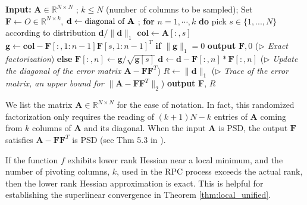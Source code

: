 \documentclass[11pt]{amsart}
\theoremstyle{plain}
\theoremstyle{definition}
\theoremstyle{remark}
\def\R{\mathbb{R}}
\def\A{\mathbf{A}}
\begin{document}
\begin{algorithm}[H]
	\small
	\caption{Random Pivoted Cholesky Factorization (RPC) \cite{chen2022randomly}}
	\label{algorithm:RPC_simple}
	\begin{algorithmic}[1]
		\State \textbf{Input:} $\A\in \R^{N\times N}$ ; $k\leq N$ (number of columns to be sampled); %
		\State \quad Set $\mathbf{F} \leftarrow O\in\R^{N\times k}$,  $\textbf{d}\leftarrow \textup{diagonal of $\A$}$ ; 
		\State \quad \textbf{for} $n=1,\cdots,k$ \textbf{do}
		\State \quad\quad pick $s\in\{1,...,N\}$ according to distribution $\mathbf{d}/\lVert \mathbf{d} \rVert_{1}$
		\State \quad\quad $\mathbf{col}\xleftarrow{} 
		\A[:,s]$
		\State \quad\quad $\mathbf{g}\xleftarrow{}\mathbf{col}-\mathbf{F}[:,1:n-1]\mathbf{F}[s,1:n-1]^T$
		\State \quad\quad \textbf{if} $\|\mathbf{g}\|_{1}=0$
		\State \quad\quad\quad \textbf{output} $\mathbf{F}, 0$ \hspace{1cm} (\textit{$\triangleright$ Exact factorization})
		\State \quad\quad \textbf{else}
		\State \quad\quad\quad $\mathbf{F}[:,n]\xleftarrow{}\mathbf{g}/\sqrt{\mathbf{g}[s]}$
		\State \quad\quad\quad $\mathbf{d}\xleftarrow{}\mathbf{d}-\mathbf{F}[:,n]*\mathbf{F}[:,n]$  \hspace{0.7cm} ($\triangleright$ \textit{Update the diagonal of the error matrix $\A-\mathbf{F}\mathbf{F}^T$})
		\State \quad $R \leftarrow \lVert \mathbf{d} \rVert_{1}$ \hspace{0.7cm} ($\triangleright$ \textit{Trace of the error matrix, an upper bound for $\|\A-\mathbf{F}\mathbf{F}^T\|_2$})
		\State \quad \textbf{output} $\mathbf{F}$, $R$
	\end{algorithmic}
\end{algorithm}
	We list the matrix $\mathbf{A}\in \R^{N\times N}$ for the ease of notation. In fact, this randomized factorization only requires the reading of $(k+1)N-k$ entries of $\mathbf{A}$ coming from $k$ columns of $\mathbf{A}$ and its diagonal. When the input $\mathbf{A}$ is PSD, the output $\mathbf{F}$ satisfies $\A-\mathbf{F}\mathbf{F}^T$ is PSD (see Thm 5.3 in \cite{zhang2006schur}).

If the function $f$ exhibits lower rank Hessian near a local minimum, and the number of pivoting columns, $k$, used in the RPC process exceeds the actual rank, then the lower rank Hessian approximation is exact. This is helpful for establishing the superlinear convergence in Theorem \ref{thm:local_unified}.  
\end{document}
